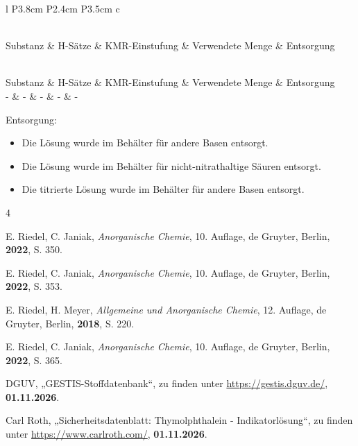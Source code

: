 \documentclass[
	a4paper,										%
	12pt,											%
	twoside,										%
	headsepline,								%
	footsepline,									%
	captions=tableheading,					%
]{scrartcl}
\newcommand{\langetabelle}[6]{  %
	\begin{centering}           %
		{\begin{longtable}[#3]{#4}
				\caption{#2\label{tab: #1}}\\				
				\hline
				#5
				\hline
				\endfirsthead
                \caption{#2\label{tab: #1}}\\
				\hline
				#5
				\hline
				\endhead
				#6												
				\hline 
		\end{longtable}}
\end{centering}}
\begin{document}
\langetabelle
	{KMR_leer2}
	{Verwendete kanzerogene, mutagene oder reproduktionstoxische Gefahrstoffe (KMR).}
	{H}
	{l P{3.8cm} P{2.4cm} P{3.5cm} c}
	{Substanz & H-Sätze & KMR-Einstufung & Verwendete Menge & Entsorgung \\}
	{ - & - & - & - & - \\}
	
Entsorgung: \\
\begin{itemize}
    \item[(1)] Die Lösung wurde im Behälter für andere Basen entsorgt.
	\item[(2)] Die Lösung wurde im Behälter für nicht-nitrathaltige Säuren entsorgt.
    \item[(3)] Die titrierte Lösung wurde im Behälter für andere Basen entsorgt.
\end{itemize}	

\begin{thebibliography}{4}		%


						{E. Riedel, C. Janiak}, 
			\textit	{Anorganische Chemie}, 
						{10. Auflage}, 
						{de Gruyter}, 
						{Berlin}, 
			\textbf	{2022}, 
			S.			{350}. 

						{E. Riedel, C. Janiak}, 
			\textit	{Anorganische Chemie}, 
						{10. Auflage}, 
						{de Gruyter}, 
						{Berlin}, 
			\textbf	{2022}, 
			S.			{353}.

						{E. Riedel, H. Meyer}, 
			\textit	{Allgemeine und Anorganische Chemie}, 
						{12. Auflage}, 
						{de Gruyter}, 
						{Berlin}, 
			\textbf	{2018}, 
			S.			{220}.

						{E. Riedel, C. Janiak}, 
			\textit	{Anorganische Chemie}, 
						{10. Auflage}, 
						{de Gruyter}, 
						{Berlin}, 
			\textbf	{2022}, 
			S.			{365}.

						{DGUV}, 
						„{GESTIS-Stoffdatenbank}“, zu finden unter 
			\url		{https://gestis.dguv.de/}, 
			\textbf	{01.11.2026}.

						{Carl Roth}, 
						„{Sicherheitsdatenblatt: Thymolphthalein - Indikatorlösung}“, zu finden unter 
			\url		{https://www.carlroth.com/}, 
			\textbf	{01.11.2026}.


\end{thebibliography}

\newpage
	
\end{document}

